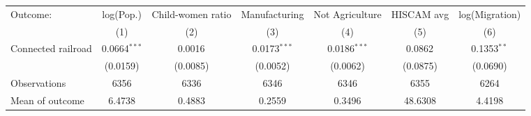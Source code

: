 \begin{tabular}{lcccccc}
  \toprule
  Outcome: & log(Pop.) & Child-women ratio & Manufacturing & Not Agriculture & HISCAM avg & log(Migration) \\
           & (1) & (2) & (3) & (4) & (5) & (6) \\
  \midrule
  Connected railroad &  0.0664$^{***}$ & 0.0016$^{}$ & 0.0173$^{***}$ & 0.0186$^{***}$ & 0.0862$^{}$ & 0.1353$^{**}$  \\
                    &  (0.0159) & (0.0085) & (0.0052) & (0.0062) & (0.0875) & (0.0690)  \\
  \cmidrule(lr){2-7}
  Observations      &  6356 & 6336 & 6346 & 6346 & 6355 & 6264  \\
  Mean of outcome   &  6.4738 & 0.4883 & 0.2559 & 0.3496 & 48.6308 & 4.4198  \\
  \bottomrule
\end{tabular}
